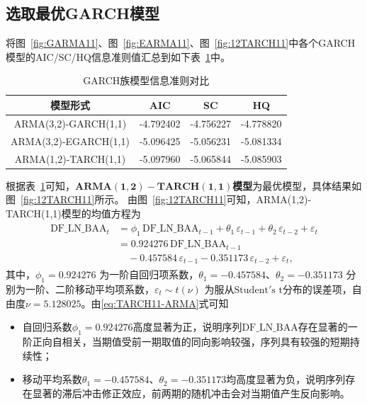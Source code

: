 \documentclass[12pt,a4paper]{ctexart}
\begin{document}
\subsection{选取最优GARCH模型}

将图~\ref{fig:GARMA11}、图~\ref{fig:EARMA11}、图~\ref{fig:12TARCH11}中各个GARCH模型的AIC/SC/HQ信息准则值汇总到如下表~\ref{tab:garch_criteria}中。
\begin{table}[H]
\centering
\caption{GARCH族模型信息准则对比}
\label{tab:garch_criteria}
\begin{tabular}{cccc}
\toprule[1.2pt] %
模型形式 & AIC & SC & HQ \\
\midrule[0.75pt] %
ARMA(3,2)-GARCH(1,1) & -4.792402 & -4.756227 & -4.778820 \\
ARMA(3,2)-EGARCH(1,1) & -5.096425 & -5.056231 & -5.081334 \\
ARMA(1,2)-TARCH(1,1) & -5.097960 & -5.065844 & -5.085903 \\
\bottomrule[1.2pt] %
\end{tabular}
\end{table}
根据表~\ref{tab:garch_criteria}可知，$\mathbf{ARMA}(\mathbf{1},\mathbf{2})-\mathbf{TARCH}(\mathbf{1},\mathbf{1})$\textbf{模型}为最优模型，具体结果如图~\ref{fig:12TARCH11}所示。
由图~\ref{fig:12TARCH11}可知，ARMA(1,2)-TARCH(1,1)模型的均值方程为
\begin{gather}\label{eq:TARCH11-ARMA}
\begin{aligned}
\mathrm{DF}\_\mathrm{LN}\_\mathrm{BAA}_t &= \phi _1\,\mathrm{DF}\_\mathrm{LN}\_\mathrm{BAA}_{t-1}+\theta _1\,\varepsilon _{t-1}+\theta _2\,\varepsilon _{t-2}+\varepsilon _t
\\
&= 0.924276\,\mathrm{DF}\_\mathrm{LN}\_\mathrm{BAA}_{t-1}
\\
&\quad - 0.457584\,\varepsilon _{t-1} - 0.351173\,\varepsilon _{t-2}+\varepsilon _t,
\end{aligned}
\end{gather}
其中，\( \phi_1 = 0.924276 \) 为一阶自回归项系数，\( \theta_1 = -0.457584 \)、\( \theta_2 = -0.351173 \) 分别为一阶、二阶移动平均项系数，\( \varepsilon_t \sim t(\nu) \) 为服从\(\mathrm{Student}' \mathrm{s}\,\,\mathrm{t} \)分布的误差项，自由度\( \nu = 5.128025 \)。由\eqref{eq:TARCH11-ARMA}式可知
\begin{itemize}
\item 自回归系数\( \phi_1 = 0.924276 \)高度显著为正，说明序列\(\mathrm{DF}\_\mathrm{LN}\_\mathrm{BAA}\)存在显著的一阶正向自相关，当期值受前一期取值的同向影响较强，序列具有较强的短期持续性；

\item 移动平均系数\( \theta_1 = -0.457584 \)、\( \theta_2 = -0.351173 \)均高度显著为负，说明序列存在显著的滞后冲击修正效应，前两期的随机冲击会对当期值产生反向影响。
\end{itemize}
\end{document}
